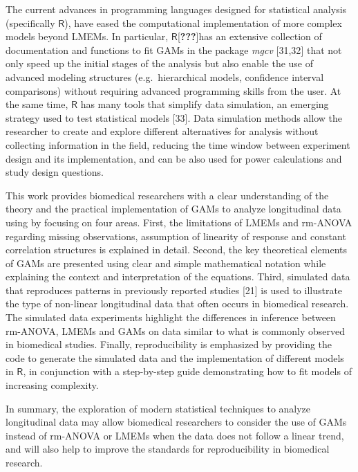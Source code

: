 \documentclass[
]{article}
\begin{document}
The current advances in programming languages designed for statistical analysis (specifically \(\textsf{R}\)), have eased the computational implementation of more complex models beyond LMEMs. In particular, \(\textsf{R}\){[}{\textbf{???}}{]}has an extensive collection of documentation and functions to fit GAMs in the package \emph{mgcv} {[}31,32{]} that not only speed up the initial stages of the analysis but also enable the use of advanced modeling structures (e.g.~hierarchical models, confidence interval comparisons) without requiring advanced programming skills from the user. At the same time, \(\textsf{R}\) has many tools that simplify data simulation, an emerging strategy used to test statistical models {[}33{]}. Data simulation methods allow the researcher to create and explore different alternatives for analysis without collecting information in the field, reducing the time window between experiment design and its implementation, and can be also used for power calculations and study design questions.

This work provides biomedical researchers with a clear understanding of the theory and the practical implementation of GAMs to analyze longitudinal data using by focusing on four areas. First, the limitations of LMEMs and rm-ANOVA regarding missing observations, assumption of linearity of response and constant correlation structures is explained in detail. Second, the key theoretical elements of GAMs are presented using clear and simple mathematical notation while explaining the context and interpretation of the equations. Third, simulated data that reproduces patterns in previously reported studies {[}21{]} is used to illustrate the type of non-linear longitudinal data that often occurs in biomedical research. The simulated data experiments highlight the differences in inference between rm-ANOVA, LMEMs and GAMs on data similar to what is commonly observed in biomedical studies. Finally, reproducibility is emphasized by providing the code to generate the simulated data and the implementation of different models in \(\textsf{R}\), in conjunction with a step-by-step guide demonstrating how to fit models of increasing complexity.

In summary, the exploration of modern statistical techniques to analyze longitudinal data may allow biomedical researchers to consider the use of GAMs instead of rm-ANOVA or LMEMs when the data does not follow a linear trend, and will also help to improve the standards for reproducibility in biomedical research.
\end{document}
